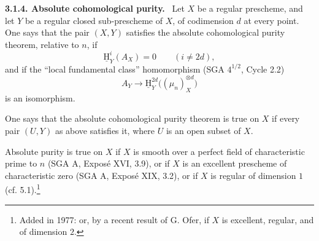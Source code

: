 \documentclass[12pt]{article}
\newcommand{\uH}{\underline{\mathrm H}}
\newenvironment{statement}[1]{\par\medskip\noindent\textbf{#1.}\ }{\par\medskip}
\begin{document}
\begin{statement}{3.1.4. Absolute cohomological purity}
Let $X$ be a regular prescheme, and let $Y$ be a regular closed sub-prescheme of $X$, of codimension $d$ at every point. One says that the pair $(X,Y)$ satisfies the absolute cohomological purity theorem, relative to $n$, if
\[
   \uH^i_Y(A_X)=0\qquad (i\ne 2d),
\]
and if the ``local fundamental class'' homomorphism (SGA $4^{1/2}$, Cycle 2.2)
\[
   A_Y\longrightarrow \uH^{2d}_Y\bigl((\mu_n)^{\otimes d}_X\bigr)
\]
is an isomorphism.

One says that the absolute cohomological purity theorem is true on $X$ if every pair $(U,Y)$ as above satisfies it, where $U$ is an open subset of $X$.

Absolute purity is true on $X$ if $X$ is smooth over a perfect field of characteristic prime to $n$ (SGA A, Exposé XVI, 3.9), or if $X$ is an excellent prescheme of characteristic zero (SGA A, Exposé XIX, 3.2), or if $X$ is regular of dimension $1$ (cf. 5.1).\footnote{Added in 1977: or, by a recent result of G. Ofer, if $X$ is excellent, regular, and of dimension $2$.}
\end{statement}
\end{document}
